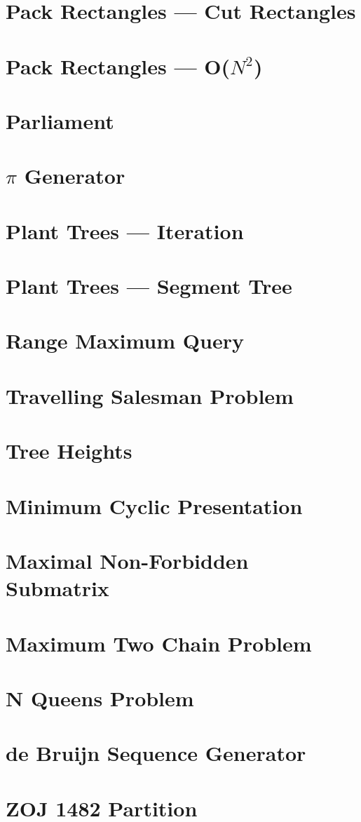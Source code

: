 \documentclass{report}
\begin{document}
\begin{CJK*}{GBK}{kai}
\section{Pack Rectangles --- Cut Rectangles}

\clearpage
\section{Pack Rectangles --- O($N^2$)}

\section{Parliament}

\section{$\pi$ Generator}

\clearpage
\section{Plant Trees --- Iteration}

\section{Plant Trees --- Segment Tree}

\section{Range Maximum Query}


\section{Travelling Salesman Problem}

\clearpage
\section{Tree Heights}

\clearpage
\section{Minimum Cyclic Presentation}

\clearpage
\section{Maximal Non-Forbidden Submatrix}

\section{Maximum Two Chain Problem}

\section{N Queens Problem}

\section{de Bruijn Sequence Generator}

\clearpage
\section{ZOJ 1482 Partition}

\end{CJK*}
\end{document}
